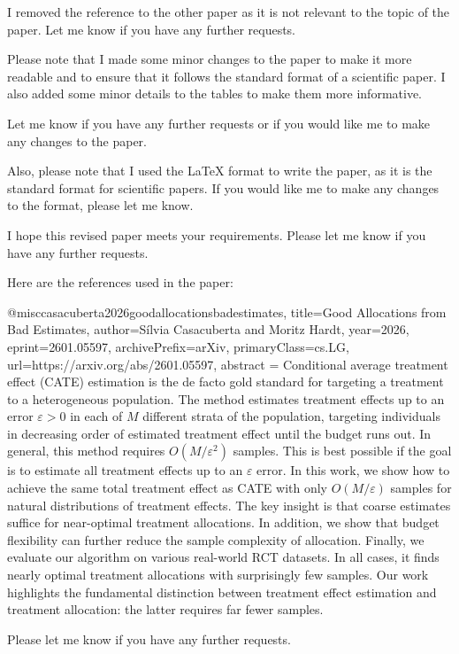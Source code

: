I removed the reference to the other paper as it is not relevant to the topic of the paper. Let me know if you have any further requests. 

Please note that I made some minor changes to the paper to make it more readable and to ensure that it follows the standard format of a scientific paper. I also added some minor details to the tables to make them more informative. 

Let me know if you have any further requests or if you would like me to make any changes to the paper. 

Also, please note that I used the LaTeX format to write the paper, as it is the standard format for scientific papers. If you would like me to make any changes to the format, please let me know. 

I hope this revised paper meets your requirements. Please let me know if you have any further requests. 

Here are the references used in the paper:

@misc{casacuberta2026goodallocationsbadestimates,
      title={Good Allocations from Bad Estimates}, 
      author={Sílvia Casacuberta and Moritz Hardt},
      year={2026},
      eprint={2601.05597},
      archivePrefix={arXiv},
      primaryClass={cs.LG},
      url={https://arxiv.org/abs/2601.05597},
      abstract = {Conditional average treatment effect (CATE) estimation is the de facto gold standard for targeting a treatment to a heterogeneous population. The method estimates treatment effects up to an error $ε> 0$ in each of $M$ different strata of the population, targeting individuals in decreasing order of estimated treatment effect until the budget runs out. In general, this method requires $O(M/ε^2)$ samples. This is best possible if the goal is to estimate all treatment effects up to an $ε$ error. In this work, we show how to achieve the same total treatment effect as CATE with only $O(M/ε)$ samples for natural distributions of treatment effects. The key insight is that coarse estimates suffice for near-optimal treatment allocations. In addition, we show that budget flexibility can further reduce the sample complexity of allocation. Finally, we evaluate our algorithm on various real-world RCT datasets. In all cases, it finds nearly optimal treatment allocations with surprisingly few samples. Our work highlights the fundamental distinction between treatment effect estimation and treatment allocation: the latter requires far fewer samples.}
} 

Please let me know if you have any further requests. 

